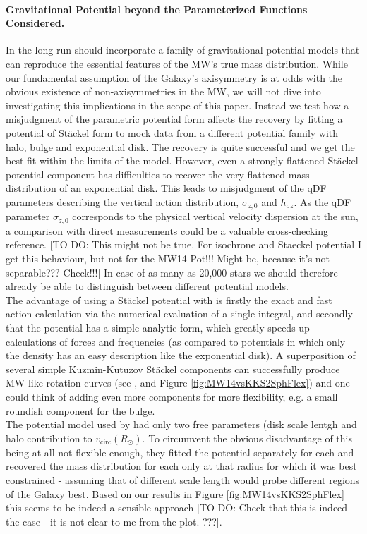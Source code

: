\paragraph{Gravitational Potential beyond the Parameterized Functions Considered.}  In the long run \RM should incorporate a family of gravitational potential models that can reproduce the essential features of the MW's true mass distribution. While our fundamental assumption of the Galaxy's axisymmetry is at odds with the obvious existence of non-axisymmetries in the MW, we will not dive into investigating this implications in the scope of this paper. Instead we test how a misjudgment of the parametric potential form affects the recovery by fitting a potential of St\"{a}ckel form \citep{bat94} to mock data from a different potential family with halo, bulge and exponential disk. The recovery is quite successful and we get the best fit within the limits of the model. However, even a strongly flattened St\"{a}ckel potential component has difficulties to recover the very flattened mass distribution of an exponential disk. This leads to misjudgment of the qDF parameters describing the vertical action distribution, $\sigma_{z,0}$ and $h_{\sigma z}$. As the qDF parameter $\sigma_{z,0}$ corresponds to the physical vertical velocity dispersion at the sun, a comparison with direct measurements could be a valuable cross-checking reference. [TO DO: This might not be true. For isochrone and Staeckel potential I get this behaviour, but not for the MW14-Pot!!! Might be, because it's not separable??? Check!!!] In case of as many as 20,000 stars we should therefore already be able to distinguish between different potential models.
\\The advantage of using a St\"{a}ckel potential with \RM is firstly the exact and fast action calculation via the numerical evaluation of a single integral, and secondly that the potential has a simple analytic form, which greatly speeds up calculations of forces and frequencies (as compared to potentials in which only the density has an easy description like the exponential disk). A superposition of several simple Kuzmin-Kutuzov St\"{a}ckel components can successfully produce MW-like rotation curves (see \citet{bat94}, \citet{2003MNRAS.340..752F} and Figure \ref{fig:MW14vsKKS2SphFlex}) and one could think of adding even more components for more flexibility, e.g. a small roundish component for the bulge.
\\The potential model used by \citet{bov13} had only two free parameters (disk scale lentgh and halo contribution to $v_\text{circ}(R_\odot)$. To circumvent the obvious disadvantage of this being at all not flexible enough, they fitted the potential separately for each \MAP and recovered the mass distribution for each \MAP only at that radius for which it was best constrained - assuming that \MAPs of different scale length would probe different regions of the Galaxy best. Based on our results in Figure \ref{fig:MW14vsKKS2SphFlex} this seems to be indeed a sensible approach [TO DO: Check that this is indeed the case - it is not clear to me from the plot. ???].
